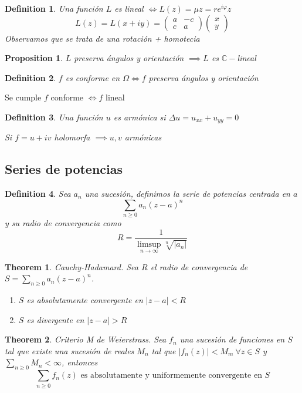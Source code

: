 \documentclass{myclass}
\newtheorem*{definition}{Definition}
\newtheorem*{theorem}{Theorem}
\newtheorem*{proposition}{Proposition}
\begin{document}
\begin{definition}
Una función $L$ es lineal $\iff L(z) = \mu z = re^{i\varphi }z$ 
\[
  L(z) = L(x + iy) = \begin{pmatrix} a & -c \\ c & a \end{pmatrix} \begin{pmatrix} x \\ y \end{pmatrix} 
\] 
Observamos que se trata de una rotación + homotecia
\end{definition}

\begin{proposition}
$L$ preserva ángulos y orientación $\implies L $ es $\mathbb{C}-$lineal
\end{proposition}

\begin{definition}
$f$ es conforme en $\Omega \iff f$ preserva ángulos y orientación
\end{definition}

Se cumple $f$ conforme  $\iff f$ lineal

\begin{definition}
Una función $u$ es armónica si $\Delta u = u_{x x} + u_{yy} = 0$ 

Si $f = u + iv$ holomorfa  $\implies u, v$ armónicas
\end{definition}

\subsection{Series de potencias}
\begin{definition}
Sea $a_n$ una sucesión, definimos la serie de potencias centrada en $a$
\[
\sum_{n\ge 0} a_n(z-a)^n
\] 
y su radio de convergencia como
\[
R = \frac{1}{\limsup_{n\to \infty} \sqrt[n]{|a_n|} }
\] 
\end{definition}

\begin{theorem}
Cauchy-Hadamard. Sea $R$ el radio de convergencia de  $S = \sum_{n\ge 0} a_n (z-a)^n$.
\begin{enumerate}[topsep=0pt, itemsep=0pt]
  \item $S$ es absolutamente convergente en  $|z-a|<R$ 
  \item $S$ es divergente en  $|z-a|>R$ 
\end{enumerate}
\end{theorem}

\begin{theorem}
Criterio M de Weierstrass. Sea $f_n$ una sucesión de funciones en $S$ tal que existe una sucesión de reales  $M_n$ tal que  $|f_n(z)|<M_m \ \forall z\in S$  y $\sum_{n\ge 0} M_n<\infty$, entonces
\[
\sum_{n\ge 0} f_n(z) \text{ es absolutamente y uniformemente convergente en } S
\] 
\end{theorem}
\end{document}
